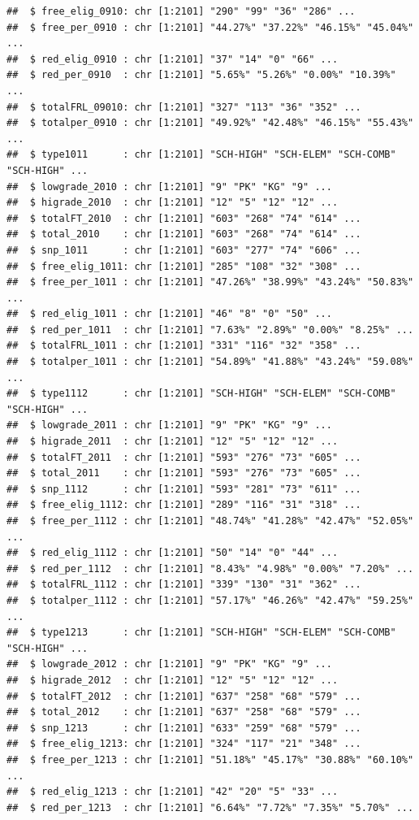 \documentclass[
]{book}
\begin{document}
\begin{verbatim}
##  $ free_elig_0910: chr [1:2101] "290" "99" "36" "286" ...
##  $ free_per_0910 : chr [1:2101] "44.27%" "37.22%" "46.15%" "45.04%" ...
##  $ red_elig_0910 : chr [1:2101] "37" "14" "0" "66" ...
##  $ red_per_0910  : chr [1:2101] "5.65%" "5.26%" "0.00%" "10.39%" ...
##  $ totalFRL_09010: chr [1:2101] "327" "113" "36" "352" ...
##  $ totalper_0910 : chr [1:2101] "49.92%" "42.48%" "46.15%" "55.43%" ...
##  $ type1011      : chr [1:2101] "SCH-HIGH" "SCH-ELEM" "SCH-COMB" "SCH-HIGH" ...
##  $ lowgrade_2010 : chr [1:2101] "9" "PK" "KG" "9" ...
##  $ higrade_2010  : chr [1:2101] "12" "5" "12" "12" ...
##  $ totalFT_2010  : chr [1:2101] "603" "268" "74" "614" ...
##  $ total_2010    : chr [1:2101] "603" "268" "74" "614" ...
##  $ snp_1011      : chr [1:2101] "603" "277" "74" "606" ...
##  $ free_elig_1011: chr [1:2101] "285" "108" "32" "308" ...
##  $ free_per_1011 : chr [1:2101] "47.26%" "38.99%" "43.24%" "50.83%" ...
##  $ red_elig_1011 : chr [1:2101] "46" "8" "0" "50" ...
##  $ red_per_1011  : chr [1:2101] "7.63%" "2.89%" "0.00%" "8.25%" ...
##  $ totalFRL_1011 : chr [1:2101] "331" "116" "32" "358" ...
##  $ totalper_1011 : chr [1:2101] "54.89%" "41.88%" "43.24%" "59.08%" ...
##  $ type1112      : chr [1:2101] "SCH-HIGH" "SCH-ELEM" "SCH-COMB" "SCH-HIGH" ...
##  $ lowgrade_2011 : chr [1:2101] "9" "PK" "KG" "9" ...
##  $ higrade_2011  : chr [1:2101] "12" "5" "12" "12" ...
##  $ totalFT_2011  : chr [1:2101] "593" "276" "73" "605" ...
##  $ total_2011    : chr [1:2101] "593" "276" "73" "605" ...
##  $ snp_1112      : chr [1:2101] "593" "281" "73" "611" ...
##  $ free_elig_1112: chr [1:2101] "289" "116" "31" "318" ...
##  $ free_per_1112 : chr [1:2101] "48.74%" "41.28%" "42.47%" "52.05%" ...
##  $ red_elig_1112 : chr [1:2101] "50" "14" "0" "44" ...
##  $ red_per_1112  : chr [1:2101] "8.43%" "4.98%" "0.00%" "7.20%" ...
##  $ totalFRL_1112 : chr [1:2101] "339" "130" "31" "362" ...
##  $ totalper_1112 : chr [1:2101] "57.17%" "46.26%" "42.47%" "59.25%" ...
##  $ type1213      : chr [1:2101] "SCH-HIGH" "SCH-ELEM" "SCH-COMB" "SCH-HIGH" ...
##  $ lowgrade_2012 : chr [1:2101] "9" "PK" "KG" "9" ...
##  $ higrade_2012  : chr [1:2101] "12" "5" "12" "12" ...
##  $ totalFT_2012  : chr [1:2101] "637" "258" "68" "579" ...
##  $ total_2012    : chr [1:2101] "637" "258" "68" "579" ...
##  $ snp_1213      : chr [1:2101] "633" "259" "68" "579" ...
##  $ free_elig_1213: chr [1:2101] "324" "117" "21" "348" ...
##  $ free_per_1213 : chr [1:2101] "51.18%" "45.17%" "30.88%" "60.10%" ...
##  $ red_elig_1213 : chr [1:2101] "42" "20" "5" "33" ...
##  $ red_per_1213  : chr [1:2101] "6.64%" "7.72%" "7.35%" "5.70%" ...

\end{verbatim}
\end{document}
